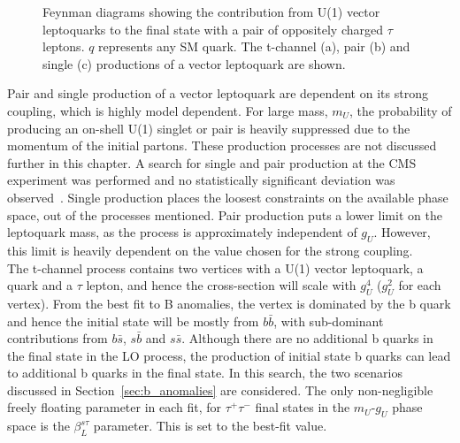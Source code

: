 \begin{figure}[t]
\begin{subfigure}[b]{0.3\textwidth}
\caption{}
\end{subfigure}
\vspace*{10mm}
\caption[Feynman diagrams for the production of a di-$\tau$ final state from vector leptoquarks.]{Feynman diagrams showing the contribution from U(1) vector leptoquarks to the final state with a pair of oppositely charged $\tau$ leptons. $q$ represents any SM quark. The t-channel (a), pair (b) and single (c) productions of a vector leptoquark are shown.}
\label{fig:leptoquark_feynman}
\end{figure}

Pair and single production of a vector leptoquark are dependent on its strong coupling, which is highly model dependent.
For large mass, $m_U$, the probability of producing an on-shell U(1) singlet or pair is heavily suppressed due to the momentum of the initial partons.
These production processes are not discussed further in this chapter.
A search for single and pair production at the \ac{CMS} experiment was performed and no statistically significant deviation was observed~\cite{CMS:2022zks}.
Single production places the loosest constraints on the available phase space, out of the processes mentioned.
Pair production puts a lower limit on the leptoquark mass, as the process is approximately independent of $g_U$. 
However, this limit is heavily dependent on the value chosen for the strong coupling. \\

The t-channel process contains two vertices with a U(1) vector leptoquark, a quark and a $\tau$ lepton, and hence the cross-section will scale with $g_{U}^4$ ($g_{U}^2$ for each vertex).
From the best fit to B anomalies, the vertex is dominated by the b quark and hence the initial state will be mostly from $b\bar{b}$, with sub-dominant contributions from $b\bar{s}$, $s\bar{b}$ and $s\bar{s}$.
Although there are no additional b quarks in the final state in the \ac{LO} process, the production of initial state b quarks can lead to additional b quarks in the final state.
In this search, the two scenarios discussed in Section~\ref{sec:b_anomalies} are considered.
The only non-negligible freely floating parameter in each fit, for $\tau^{+}\tau^{-}$ final states in the $m_{U}$-$g_{U}$ phase space is the $\beta_{L}^{s\tau}$ parameter.
This is set to the best-fit value. \\

